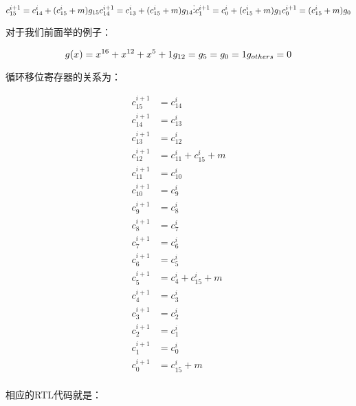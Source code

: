 \documentclass[
]{article}
\begin{document}
$$
c_{15}^{i+1}=c_{14}^{i}+(c_{15}^i+m)g_{15}\\
c_{14}^{i+1}=c_{13}^{i}+(c_{15}^i+m)g_{14}\\
\vdots\\
c_{1}^{i+1}=c_{0}^{i}+(c_{15}^i+m)g_{1}\\
c_{0}^{i+1}=(c_{15}^i+m)g_{0}\\
$$

对于我们前面举的例子：

$$
g(x)=x^{16}+x^{12}+x^5+1\\
g_{12}=g_{5}=g_{0}=1\\
g_{others}=0
$$

循环移位寄存器的关系为：

\begin{align}
c_{15}^{i+1}&=c_{14}^{i}\\
c_{14}^{i+1}&=c_{13}^{i}\\
c_{13}^{i+1}&=c_{12}^{i}\\
c_{12}^{i+1}&=c_{11}^{i}+c_{15}^i+m\\
c_{11}^{i+1}&=c_{10}^{i}\\
c_{10}^{i+1}&=c_{ 9}^{i}\\
c_{ 9}^{i+1}&=c_{ 8}^{i}\\
c_{ 8}^{i+1}&=c_{ 7}^{i}\\
c_{ 7}^{i+1}&=c_{ 6}^{i}\\
c_{ 6}^{i+1}&=c_{ 5}^{i}\\
c_{ 5}^{i+1}&=c_{ 4}^{i}+c_{15}^i+m\\
c_{ 4}^{i+1}&=c_{ 3}^{i}\\
c_{ 3}^{i+1}&=c_{ 2}^{i}\\
c_{ 2}^{i+1}&=c_{ 1}^{i}\\
c_{ 1}^{i+1}&=c_{ 0}^{i}\\
c_{ 0}^{i+1}&=c_{15}^i+m\\
\end{align}

相应的RTL代码就是：
\end{document}
